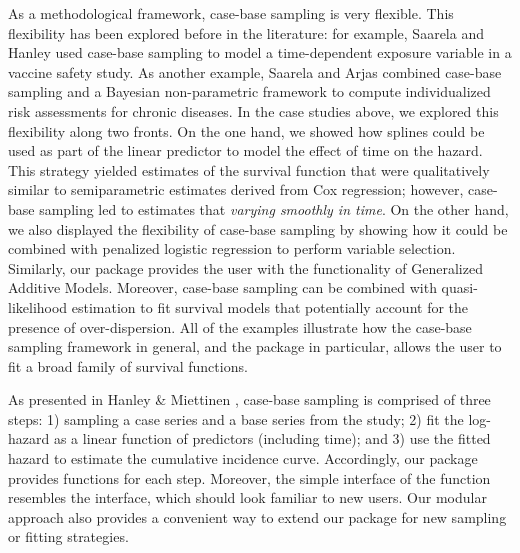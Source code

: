\documentclass[
]{jss}
\begin{document}
As a methodological framework, case-base sampling is very flexible. This
flexibility has been explored before in the literature: for example,
Saarela and Hanley \citeyearpar{saarela2015case} used case-base sampling
to model a time-dependent exposure variable in a vaccine safety study.
As another example, Saarela and Arjas \citeyearpar{saarela2015non}
combined case-base sampling and a Bayesian non-parametric framework to
compute individualized risk assessments for chronic diseases. In the
case studies above, we explored this flexibility along two fronts. On
the one hand, we showed how splines could be used as part of the linear
predictor to model the effect of time on the hazard. This strategy
yielded estimates of the survival function that were qualitatively
similar to semiparametric estimates derived from Cox regression;
however, case-base sampling led to estimates that \emph{varying smoothly
in time}. On the other hand, we also displayed the flexibility of
case-base sampling by showing how it could be combined with penalized
logistic regression to perform variable selection. Similarly, our
package  provides the user with the functionality of
Generalized Additive Models. Moreover, case-base sampling can be
combined with quasi-likelihood estimation to fit survival models that
potentially account for the presence of over-dispersion. All of the
examples illustrate how the case-base sampling framework in general, and
the package  in particular, allows the user to fit a broad
family of survival functions.

As presented in Hanley \& Miettinen \citeyearpar{hanley2009fitting},
case-base sampling is comprised of three steps: 1) sampling a case
series and a base series from the study; 2) fit the log-hazard as a
linear function of predictors (including time); and 3) use the fitted
hazard to estimate the cumulative incidence curve. Accordingly, our
package provides functions for each step. Moreover, the simple interface
of the  function resembles the 
interface, which should look familiar to new users. Our modular approach
also provides a convenient way to extend our package for new sampling or
fitting strategies.
\end{document}
